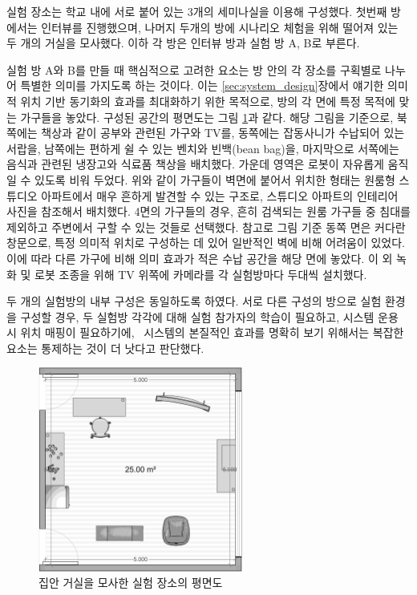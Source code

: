 
실험 장소는 학교 내에 서로 붙어 있는 3개의 세미나실을 이용해 구성했다. 첫번째 방에서는 인터뷰를 진행했으며, 나머지 두개의 방에 시나리오 체험을 위해 떨어져 있는 두 개의 거실을 모사했다. 이하 각 방은 인터뷰 방과 실험 방 A, B로 부른다.

실험 방 A와 B를 만들 때 핵심적으로 고려한 요소는 방 안의 각 장소를 구획별로 나누어 특별한 의미를 가지도록 하는 것이다. 이는 \ref{sec:system_design}장에서 얘기한 의미적 위치 기반 동기화의 효과를 최대화하기 위한 목적으로, 방의 각 면에 특정 목적에 맞는 가구들을 놓았다. 구성된 공간의 평면도는 그림 \ref{fig:floorplan}과 같다. 해당 그림을 기준으로, 북쪽에는 책상과 같이 공부와 관련된 가구와 TV를, 동쪽에는 잡동사니가 수납되어 있는 서랍을, 남쪽에는 편하게 쉴 수 있는 벤치와 빈백(bean bag)을, 마지막으로 서쪽에는 음식과 관련된 냉장고와 식료품 책상을 배치했다. 가운데 영역은 로봇이 자유롭게 움직일 수 있도록 비워 두었다. 위와 같이 가구들이 벽면에 붙어서 위치한 형태는 원룸형 스튜디오 아파트에서 매우 흔하게 발견할 수 있는 구조로, 스튜디오 아파트의 인테리어 사진을 참조해서 배치했다. 4면의 가구들의 경우, 흔히 검색되는 원룸 가구들 중 침대를 제외하고 주변에서 구할 수 있는 것들로 선택했다. 참고로 그림 기준 동쪽 면은 커다란 창문으로, 특정 의미적 위치로 구성하는 데 있어 일반적인 벽에 비해 어려움이 있었다. 이에 따라 다른 가구에 비해 의미 효과가 적은 수납 공간을 해당 면에 놓았다. 이 외 녹화 및 로봇 조종을 위해 TV 위쪽에 카메라를 각 실험방마다 두대씩 설치했다.

두 개의 실험방의 내부 구성은 동일하도록 하였다. 서로 다른 구성의 방으로 실험 환경을 구성할 경우, 두 실험방 각각에 대해 실험 참가자의 학습이 필요하고, 시스템 운용 시 위치 매핑이 필요하기에, \sysname\ 시스템의 본질적인 효과를 명확히 보기 위해서는 복잡한 요소는 통제하는 것이 더 낫다고 판단했다.


\begin{figure}
\centering
\includegraphics[width=0.6\textwidth]{images/floorplan}
\caption{집안 거실을 모사한 실험 장소의 평면도}
\label{fig:floorplan}
\end{figure}


